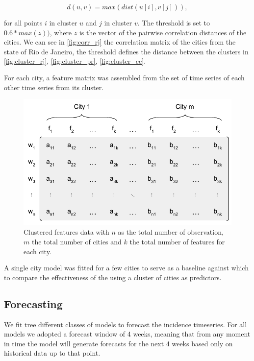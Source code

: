 \documentclass[12pt]{report}
\begin{document}
$$d(u,v) = max(dist(u[i],v[j])), $$

for all points $i$ in cluster $u$ and $j$ in cluster $v$. The threshold is set to $0.6*max(z))$, where $z$ is the vector of the pairwise correlation distances of the cities. We can see in  \ref{fig:corr_rj} the correlation matrix of the cities from the state of Rio de Janeiro, the threshold defines the distance between the clusters in \ref{fig:cluster_rj}, \ref{fig:cluster_pr}, \ref{fig:cluster_ce}.

For each city, a feature matrix was assembled from the set of time series of each other time series from its cluster.

\begin{figure}[!ht]
\centering
\includegraphics[scale=0.8]{cluster_matrix.pdf}
\caption{Clustered features data with $n$ as the total number of observation, $m$ the total number of cities and $k$ the total number of features for each city.}
\label{fig:m_cluster}
\end{figure}

A single city model was fitted  for a few  cities to serve as a 
baseline against which to compare the effectiveness of the using a cluster of cities as predictors.

\subsection{Forecasting}

We fit tree different classes of models to forecast the incidence timeseries. For all models we adopted a forecast window of 4 weeks, meaning that from any moment in time the model will generate forecasts for the next 4 weeks based only on historical data up to that point.
\end{document}
